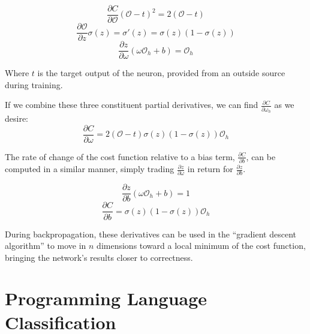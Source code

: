 \documentclass{article}
\begin{document}
$$\frac{\partial{C}}{\partial{\mathcal{O}}}(\mathcal{O}-t)^2=2(\mathcal{O}-t)$$
$$\frac{\partial{\mathcal{O}}}{\partial{z}}\sigma(z)=\sigma'(z)=\sigma(z)(1-\sigma(z))$$
$$\frac{\partial{z}}{\partial{\omega}}(\omega\mathcal{O}_h+b)=\mathcal{O}_h$$

Where $t$ is the target output of the neuron, provided from an outside source during training.

If we combine these three constituent partial derivatives, we can find $\frac{\partial{C}}{\partial{\omega_h}}$ as we desire:
$$\frac{\partial{C}}{\partial{\omega}}=2(\mathcal{O}-t)\sigma(z)(1-\sigma(z))\mathcal{O}_h$$

The rate of change of the cost function relative to a bias term, $\frac{\partial{C}}{\partial{b}}$, can be computed in a similar manner, simply trading $\frac{\partial{z}}{\partial{\omega}}$ in return for $\frac{\partial{z}}{\partial{b}}$.

$$\frac{\partial{z}}{\partial{b}}(\omega\mathcal{O}_h+b)=1$$
$$\frac{\partial{C}}{\partial{b}}=\sigma(z)(1-\sigma(z))\mathcal{O}_h$$

During backpropagation, these derivatives can be used in the ``gradient descent algorithm'' to move in $n$ dimensions toward a local minimum of the cost function, bringing the network's results closer to correctness.

\section{Programming Language Classification}
\end{document}
